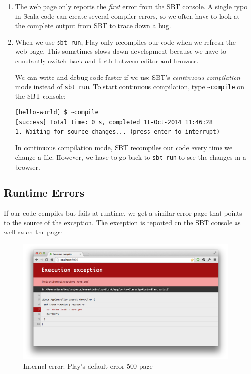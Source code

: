 \documentclass[oneside,11pt,a4paper,]{book}
\begin{document}
\begin{enumerate}
\def\labelenumi{\arabic{enumi}.}
\item
  The web page only reports the \emph{first} error from the SBT console.
  A single typo in Scala code can create several compiler errors, so we
  often have to look at the complete output from SBT to trace down a
  bug.
\item
  When we use \texttt{sbt run}, Play only recompiles our code when we
  refresh the web page. This sometimes slows down development because we
  have to constantly switch back and forth between editor and browser.

  We can write and debug code faster if we use SBT's \emph{continuous
  compilation} mode instead of \texttt{sbt run}. To start continuous
  compilation, type \texttt{\textasciitilde{}compile} on the SBT
  console:

\begin{verbatim}
[hello-world] $ ~compile
[success] Total time: 0 s, completed 11-Oct-2014 11:46:28
1. Waiting for source changes... (press enter to interrupt)
\end{verbatim}

  In continuous compilation mode, SBT recompiles our code every time we
  change a file. However, we have to go back to \texttt{sbt run} to see
  the changes in a browser.
\end{enumerate}

\subsection{Runtime Errors}\label{runtime-errors}

If our code compiles but fails at runtime, we get a similar error page
that points to the source of the exception. The exception is reported on
the SBT console as well as on the page:

\begin{figure}[htbp]
\centering
\includegraphics{src/pages/basics/internal-error.png}
\caption{Internal error: Play's default error 500 page}
\end{figure}
\end{document}
